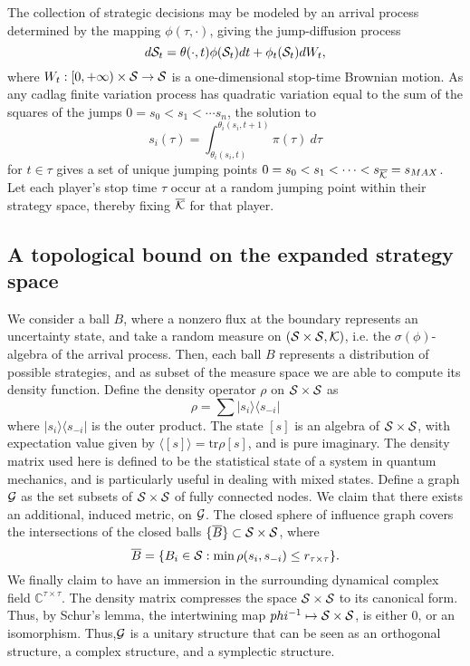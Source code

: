 The collection of strategic decisions may be modeled by an arrival process
determined by the mapping $\phi(\tau, \cdot)$, giving the jump-diffusion
process
$$
    d\mathcal{S}_t = \theta(\cdot, t) \phi(\mathcal{S}_t) dt + \phi_t(\mathcal{S}_t) dW_t,
$$
where $W_t: [0, +\infty) \times \mathcal{S} \rightarrow \mathcal{S}$ is a one-dimensional
stop-time Brownian motion. 
As any cadlag finite variation process has quadratic variation equal to the sum
of the squares of the jumps $0=s_0<s_1<\cdots s_n$, the solution to
$$
    s_i(\tau) = \int_{\theta_i(s_i, t)}^{\theta_i(s_i,t+1)} \pi(\tau) \ d\tau
$$ 
for $t \in \tau$ gives a set of unique jumping points $0=s_0<s_1< \cdots < s_{\overline {\mathcal{K}}} = s_{MAX}$. 
Let each player's stop time $\tau$ occur at a random jumping point within their
strategy space, thereby fixing $\overline{\mathcal{K}}$ for that player.

\subsection{A topological bound on the expanded strategy space}

We consider a ball $B$, where a nonzero flux at the boundary represents an
uncertainty state, and take a random measure on $(\mathcal{S} \times \mathcal{S}, \mathcal{K})$, i.e.
the $\sigma(\phi)$-algebra of the arrival process.
Then, each ball $B$ represents a distribution of possible strategies, and as subset of the
measure space we are able to compute its density function. 
Define the density operator $\rho$ on $\mathcal{S}\times \mathcal{S}$ as
$$
    \rho = \displaystyle\sum \vert s_i\rangle\langle s_{-i}\vert
$$
where $\vert s_i\rangle\langle s_{-i}\vert$ is the outer product. The state
$[s]$ is an algebra of $\mathcal{S}\times\mathcal{S}$, with expectation
value given by $\langle [s] \rangle = \text{tr}{\rho [s]}$, and is pure imaginary.
The density matrix used here is defined to be the statistical state of a system in
quantum mechanics, and is particularly useful in dealing with mixed states.
Define a graph $\mathcal{G}$ as the set subsets of $\mathcal{S}\times\mathcal{S}$ of fully connected nodes.
We claim that there exists an additional, induced metric, on $\mathcal{G}$.
The closed sphere of influence graph covers the intersections
of the closed balls $\lbrace\overline{B}\rbrace \subset \mathcal{S}\times \mathcal{S}$, where
$$
    \overline{B}= \lbrace B_i \in \mathcal{S} : \min\rho(s_i, s_{-i}) \le
    r_{\tau\times\tau} \rbrace.
$$
We finally claim to have an immersion in the surrounding
dynamical complex field $\mathbb{C}^{\tau\times\tau}$. The density matrix compresses
the space $\mathcal{S} \times \mathcal{S}$ to its canonical form. Thus, by Schur's lemma, the intertwining map
$phi^{-1} \mapsto \mathcal{S} \times \mathcal{S}$, is either $0$, or an isomorphism.
Thus,$\mathcal{G}$ is a unitary structure that can be seen as an orthogonal structure, a complex
structure, and a symplectic structure.

